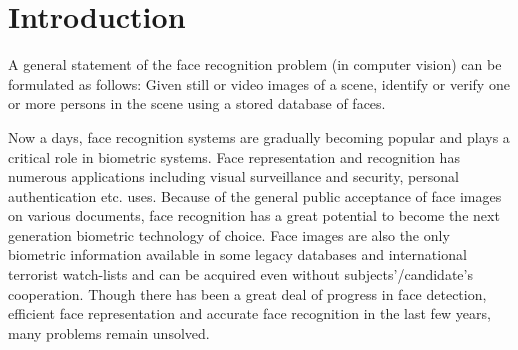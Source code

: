 \section{Introduction}

A general statement of the face recognition problem (in computer vision) can be formulated as follows: Given still or video images of a scene, identify or verify one or more persons in the scene using a stored database of faces.   

Now a days, face recognition systems are gradually becoming popular and plays a critical role in biometric systems.  Face representation   and   recognition   has   numerous applications   including   visual   surveillance   and   security, personal authentication etc. uses. Because of the general public acceptance of face images on various documents, face recognition has a great   potential   to   become   the next    generation biometric technology of choice. Face images are also the only biometric information available in some legacy databases and international terrorist watch-lists and can be acquired even without subjects'/candidate's cooperation. Though there has been a great deal of progress in face detection, efficient face representation and accurate face recognition in the last few years, many problems remain unsolved. 
